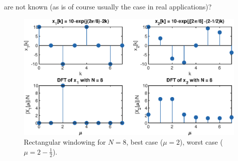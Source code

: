 \documentclass[11pt,a4paper,DIV=12]{scrartcl}
\begin{document}
are not known (as is of course usually the case in real applications)?
%
\begin{figure}
		\centering
		\includegraphics[]{graphics/DFTbestworstcase_RectWin}
		\caption{Rectangular windowing for $N=8$,
		best case ($\mu=2$), worst case ($\mu=2-\frac{1}{2}$).}
		\label{DFTbestworstcase_RectWin}
\end{figure}
\end{document}
